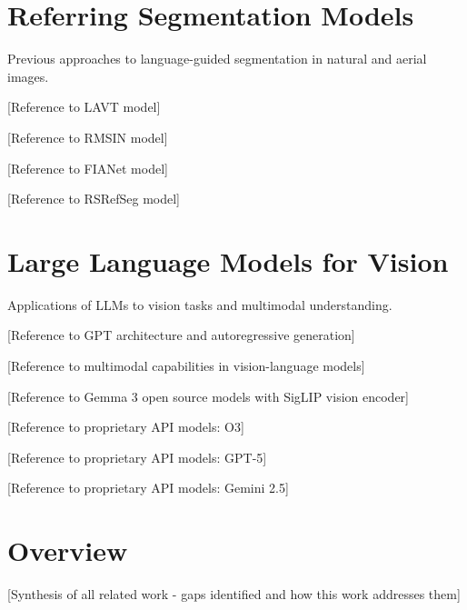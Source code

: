 \section{Referring Segmentation Models}

Previous approaches to language-guided segmentation in natural and aerial images.

[Reference to LAVT model] \cite{placeholder_lavt}

[Reference to RMSIN model] \cite{placeholder_rmsin}

[Reference to FIANet model] \cite{placeholder_fianet}

[Reference to RSRefSeg model] \cite{placeholder_rsrefseg}

\section{Large Language Models for Vision}

Applications of LLMs to vision tasks and multimodal understanding.

[Reference to GPT architecture and autoregressive generation] \cite{placeholder_gpt}

[Reference to multimodal capabilities in vision-language models] \cite{placeholder_multimodal}

[Reference to Gemma 3 open source models with SigLIP vision encoder] \cite{placeholder_gemma3}

[Reference to proprietary API models: O3] \cite{placeholder_o3}

[Reference to proprietary API models: GPT-5] \cite{placeholder_gpt5}

[Reference to proprietary API models: Gemini 2.5] \cite{placeholder_gemini25}

\section{Overview}

[Synthesis of all related work - gaps identified and how this work addresses them] \cite{placeholder_synthesis}
